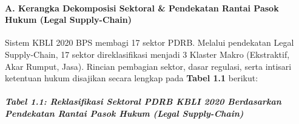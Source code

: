 \documentclass[
]{article}
\begin{document}
\paragraph{A. Kerangka Dekomposisi Sektoral \& Pendekatan Rantai Pasok
Hukum (Legal
Supply-Chain)}\label{a.-kerangka-dekomposisi-sektoral-pendekatan-rantai-pasok-hukum-legal-supply-chain}

Sistem KBLI 2020 BPS membagi 17 sektor PDRB. Melalui pendekatan Legal
Supply-Chain, 17 sektor direklasifikasi menjadi 3 Klaster Makro
(Ekstraktif, Akar Rumput, Jasa). Rincian pembagian sektor, dasar
regulasi, serta intisari ketentuan hukum disajikan secara lengkap pada
\textbf{Tabel 1.1} berikut:

\subparagraph{Tabel 1.1: Reklasifikasi Sektoral PDRB KBLI 2020
Berdasarkan Pendekatan Rantai Pasok Hukum (Legal
Supply-Chain)}\label{tabel-1.1-reklasifikasi-sektoral-pdrb-kbli-2020-berdasarkan-pendekatan-rantai-pasok-hukum-legal-supply-chain}
\end{document}
